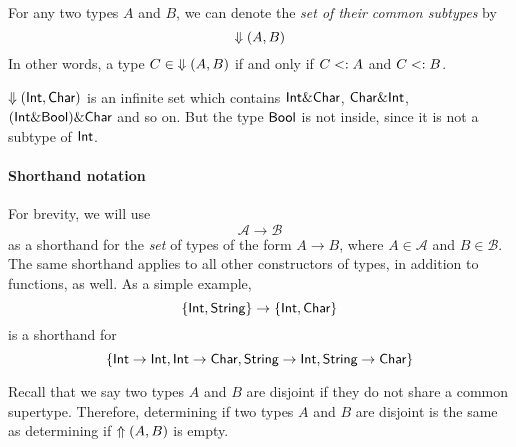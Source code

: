 \begin{definition}
  For any two types $A$ and $B$, we can denote the \emph{set of their common
  subtypes} by \[ \Downarrow(A,B) \] In other words, a type $C \in \; \Downarrow(A,B)$
  if and only  if $C <: A$ and $C <: B$.
\end{definition}

\begin{example}
  $\Downarrow(\textsf{Int},\textsf{Char})$ is an infinite set which contains $\textsf{Int} \&
  \textsf{Char}$, $\textsf{Char} \& \textsf{Int}$, $(\textsf{Int} \& \textsf{Bool}) \& \textsf{Char}$
  and so on. But the type $\textsf{Bool}$ is not inside, since it is not a subtype of
  $\textsf{Int}$.
\end{example}

\paragraph{Shorthand notation} For brevity, we will use \[ \mathcal{A} \to
\mathcal{B} \] as a shorthand for the \emph{set} of types of the form $A \to B$,
where $A \in \mathcal{A}$ and $B \in \mathcal{B}$. The same shorthand applies to
all other constructors of types, in addition to functions, as well. As a simple
example,  \[ \{ \textsf{Int}, \textsf{String} \} \to \{ \textsf{Int}, \textsf{Char} \} \] is a shorthand for \[ \{
\textsf{Int} \to \textsf{Int}, \textsf{Int} \to \textsf{Char}, \textsf{String} \to \textsf{Int}, \textsf{String} \to \textsf{Char} \} \]

Recall that we say two types $A$ and $B$ are disjoint if they do not share a
common supertype. Therefore, determining if two types $A$ and $B$ are disjoint
is the same as determining if $\Uparrow(A,B)$ is empty.

